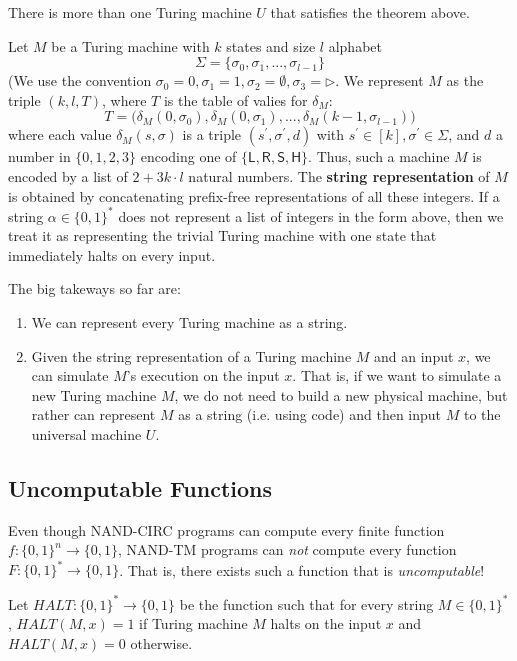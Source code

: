 \documentclass{article}
\begin{document}
  There is more than one Turing machine $U$ that satisfies the theorem above. 

  \begin{definition}
  Let $M$ be a Turing machine with $k$ states and size $l$ alphabet
  \[\Sigma = \{\sigma_0, \sigma_1, ..., \sigma_{l-1}\}\]
  (We use the convention $\sigma_0 = 0, \sigma_1 = 1, \sigma_2 = \emptyset, \sigma_3 = \triangleright$. We represent $M$ as the triple $(k, l, T)$, where $T$ is the table of valies for $\delta_M$: 
  \[T = \big(\delta_M (0, \sigma_0), \delta_M (0, \sigma_1), ..., \delta_M (k-1, \sigma_{l-1})\big)\]
  where each value $\delta_M (s, \sigma)$ is a triple $(s^\prime, \sigma^\prime, d)$ with $s^\prime \in [k], \sigma^\prime \in \Sigma$, and $d$ a number in $\{0,1,2,3\}$ encoding one of $\{\mathsf{L, R, S, H}\}$. Thus, such a machine $M$ is encoded by a list of $2 + 3k \cdot l$ natural numbers. The \textbf{string representation} of $M$ is obtained by concatenating prefix-free representations of all these integers. If a string $\alpha \in \{0,1\}^*$ does not represent a list of integers in the form above, then we treat it as representing the trivial Turing machine with one state that immediately halts on every input. 
  \end{definition}
  The big takeways so far are: 
  \begin{enumerate}
      \item We can represent every Turing machine as a string. 
      \item Given the string representation of a Turing machine $M$ and an input $x$, we can simulate $M$'s execution on the input $x$. That is, if we want to simulate a new Turing machine $M$, we do not need to build a new physical machine, but rather can represent $M$ as a string (i.e. using code) and then input $M$ to the universal machine $U$. 
  \end{enumerate}

  \subsection{Uncomputable Functions}
  Even though NAND-CIRC programs can compute every finite function $f: \{0,1\}^n \longrightarrow \{0,1\}$, NAND-TM programs can \textit{not} compute every function $F: \{0,1\}^* \longrightarrow \{0,1\}$. That is, there exists such a function that is \textit{uncomputable}! 

  \begin{definition}
  Let $HALT: \{0,1\}^* \longrightarrow \{0,1\}$ be the function such that for every string $M \in \{0,1\}^*$, $HALT(M, x) = 1$ if Turing machine $M$ halts on the input $x$ and $HALT(M, x) = 0$ otherwise. 
  \end{definition}
\end{document}
